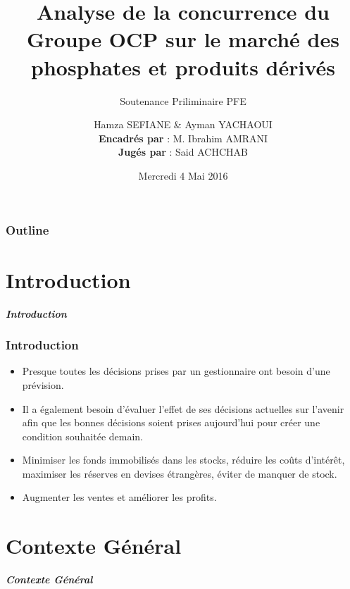 \documentclass{beamer}
\title[ENSIAS - Business Intelligence]{
  Analyse de la concurrence du Groupe OCP sur le marché des phosphates et produits dérivés}
\subtitle{\tiny{Soutenance Priliminaire PFE}}
\author[SEFIANE \& YACHAOUI]{
  Hamza SEFIANE \& Ayman YACHAOUI \\\medskip
  {\small \textbf{Encadrés par} : M. Ibrahim AMRANI} \\ 
  {\small \textbf{Jugés par} : Said ACHCHAB}}
\institute[]{
  École Nationale Supérieure d'Informatique et d'Analyse des Systèmes}
\date[Année universitaire 2015-2016]{
  Mercredi 4 Mai 2016}
\begin{document}
\begin{frame}
  \titlepage
\end{frame}

\begin{frame}
  \frametitle{Outline}

  \tableofcontents
\end{frame}

\section{Introduction}

\begin{frame}
	\begin{center}
		\Huge \textbf{\textit{Introduction}}
	\end{center}
\end{frame}

\begin{frame}
  \frametitle{Introduction}

  \begin{itemize}
    \item Presque toutes les décisions prises par un gestionnaire ont besoin d'une prévision.
    \item Il a également besoin d'évaluer l'effet de ses décisions actuelles sur l'avenir afin que les bonnes décisions soient prises aujourd'hui pour créer une condition souhaitée demain.
    \item Minimiser les fonds immobilisés dans les stocks, réduire les coûts d'intérêt, maximiser les réserves en devises étrangères, éviter de manquer de stock.
    \item Augmenter les ventes et améliorer les profits.
  \end{itemize}
\end{frame}

\section{Contexte Général}

\begin{frame}
	\begin{center}
		\Huge \textbf{\textit{Contexte Général}}
	\end{center}
\end{frame}
\end{document}
